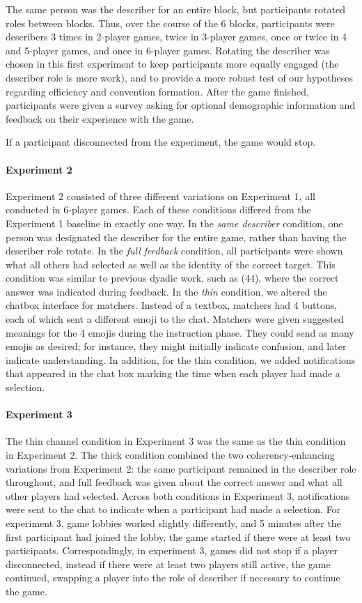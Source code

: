\documentclass[9pt,twocolumn,twoside]{pnas-new}
\begin{document}
{The same person was the describer for an entire block, but participants
rotated roles between blocks. Thus, over the course of the 6 blocks,
participants were describers 3 times in 2-player games, twice in
3-player games, once or twice in 4 and 5-player games, and once in
6-player games. Rotating the describer was chosen in this first
experiment to keep participants more equally engaged (the describer role
is more work), and to provide a more robust test of our hypotheses
regarding efficiency and convention formation. After the game finished,
participants were given a survey asking for optional demographic
information and feedback on their experience with the game.

If a participant disconnected from the experiment, the game would stop.

\paragraph{Experiment 2}

Experiment 2 consisted of three different variations on Experiment 1,
all conducted in 6-player games. Each of these conditions differed from
the Experiment 1 baseline in exactly one way. In the \emph{same
describer} condition, one person was designated the describer for the
entire game, rather than having the describer role rotate. In the
\emph{full feedback} condition, all participants were shown what all
others had selected as well as the identity of the correct target. This
condition was similar to previous dyadic work, such as (44), where the
correct answer was indicated during feedback. In the \emph{thin}
condition, we altered the chatbox interface for matchers. Instead of a
textbox, matchers had 4 buttons, each of which sent a different emoji to
the chat. Matchers were given suggested meanings for the 4 emojis during
the instruction phase. They could send as many emojis as desired; for
instance, they might initially indicate confusion, and later indicate
understanding. In addition, for the thin condition, we added
notifications that appeared in the chat box marking the time when each
player had made a selection.

\paragraph{Experiment 3}

The thin channel condition in Experiment 3 was the same as the thin
condition in Experiment 2. The thick condition combined the two
coherency-enhancing variations from Experiment 2: the same participant
remained in the describer role throughout, and full feedback was given
about the correct answer and what all other players had selected. Across
both conditions in Experiment 3, notifications were sent to the chat to
indicate when a participant had made a selection. For experiment 3, game
lobbies worked slightly differently, and 5 minutes after the first
participant had joined the lobby, the game started if there were at
least two participants. Correspondingly, in experiment 3, games did not
stop if a player disconnected, instead if there were at least two
players still active, the game continued, swapping a player into the
role of describer if necessary to continue the game.

}
\end{document}
